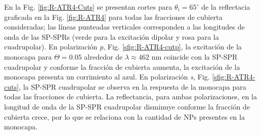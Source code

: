   En la Fig. \ref{fig:R-ATR4-Cuts} se presentan cortes para $\theta_i = 65^\circ$ de la reflectacia graficada en la Fig. \ref{fig:R-ATR4} para todas las fracciones de cubierta consideradas; las líneas punteadas verticales corresponden a las longitudes de onda de las SP-SPRs (verde para la excitación dipolar y rosa para la cuadrupolar). En polarización \emph{p}, Fig. \ref{sfig:R-ATR4-cutp}, la excitación de la monocapa para $\Theta=0.05$ alrededor de $\lambda \approx 462$ nm coincide con la SP-SPR cuadrupolar y conforme la fracción de cubierta aumenta, la excitación de la monocapa presenta un corrimiento al azul. En polarización \emph{s}, Fig. \ref{sfig:R-ATR4-cuts},  la SP-SPR cuadrupolar se observa en la respuesta de la monocapa para todas las fracciones de cubierta. La reflectancia, para ambas polarizaciones, en la longitud de onda de la SP-SPR cuadrupolar disminuye conforme la fracción de cubierta crece, por lo que se relaciona con la cantidad de NPs presentes en la monocapa.
  
